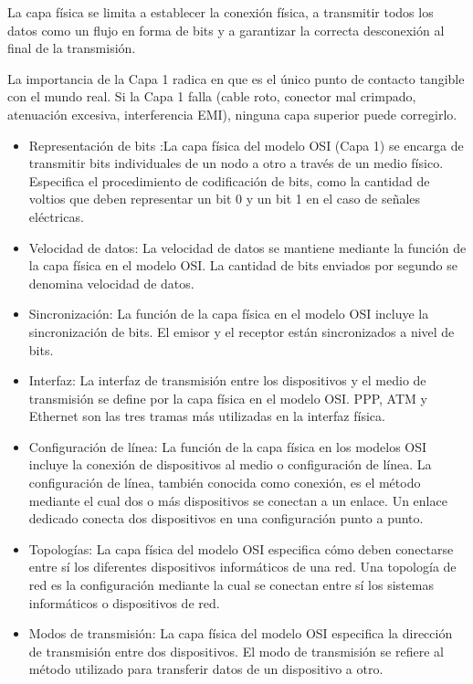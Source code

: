 \documentclass[a4paper,12pt]{article}
\begin{document}
La capa física se limita a establecer la conexión física, a transmitir todos los datos como un flujo en forma de bits y a garantizar la correcta desconexión al final de la transmisión.


La importancia de la Capa 1 radica en que es el único punto de contacto tangible con el mundo real. Si la Capa 1 falla (cable roto, conector mal crimpado, atenuación excesiva, interferencia EMI), ninguna capa superior puede corregirlo. 
\begin{itemize}
    \item Representación de bits :La capa física del modelo OSI (Capa 1) se encarga de transmitir bits individuales de un nodo a otro a través de un medio físico. Especifica el procedimiento de codificación de bits, como la cantidad de voltios que deben representar un bit 0 y un bit 1 en el caso de señales eléctricas.
    \item Velocidad de datos: La velocidad de datos se mantiene mediante la función de la capa física en el modelo OSI. La cantidad de bits enviados por segundo se denomina velocidad de datos. 
    \item Sincronización: La función de la capa física en el modelo OSI incluye la sincronización de bits. El emisor y el receptor están sincronizados a nivel de bits.
    \item Interfaz: La interfaz de transmisión entre los dispositivos y el medio de transmisión se define por la capa física en el modelo OSI. PPP, ATM y Ethernet son las tres tramas más utilizadas en la interfaz física. 
    \item Configuración de línea: La función de la capa física en los modelos OSI incluye la conexión de dispositivos al medio o configuración de línea. La configuración de línea, también conocida como conexión, es el método mediante el cual dos o más dispositivos se conectan a un enlace. Un enlace dedicado conecta dos dispositivos en una configuración punto a punto.
    \item Topologías: La capa física del modelo OSI especifica cómo deben conectarse entre sí los diferentes dispositivos informáticos de una red. Una topología de red es la configuración mediante la cual se conectan entre sí los sistemas informáticos o dispositivos de red. 
    \item Modos de transmisión: La capa física del modelo OSI especifica la dirección de transmisión entre dos dispositivos. El modo de transmisión se refiere al método utilizado para transferir datos de un dispositivo a otro.
\end{itemize}
\end{document}
